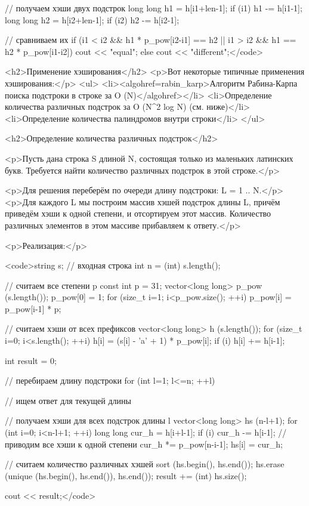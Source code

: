 // получаем хэши двух подстрок
long long h1 = h[i1+len-1];
if (i1)  h1 -= h[i1-1];
long long h2 = h[i2+len-1];
if (i2)  h2 -= h[i2-1];

// сравниваем их
if (i1 < i2 && h1 * p_pow[i2-i1] == h2 ||
	i1 > i2 && h1 == h2 * p_pow[i1-i2])
	cout << "equal";
else
	cout << "different";</code>

<h2>Применение хэширования</h2>
<p>Вот некоторые типичные применения хэширования:</p>
<ul>
<li><algohref=rabin_karp>Алгоритм Рабина-Карпа поиска подстроки в строке за O (N)</algohref></li>
<li>Определение количества различных подстрок за O (N^2 log N) (см. ниже)</li>
<li>Определение количества палиндромов внутри строки</li>
</ul>

<h2>Определение количества различных подстрок</h2>

<p>Пусть дана строка S длиной N, состоящая только из маленьких латинских букв. Требуется найти количество различных подстрок в этой строке.</p>

<p>Для решения переберём по очереди длину подстроки: L = 1 .. N.</p>
<p>Для каждого L мы построим массив хэшей подстрок длины L, причём приведём хэши к одной степени, и отсортируем этот массив. Количество различных элементов в этом массиве прибавляем к ответу.</p>

<p>Реализация:</p>

<code>string s; // входная строка
int n = (int) s.length();

// считаем все степени p
const int p = 31;
vector<long long> p_pow (s.length());
p_pow[0] = 1;
for (size_t i=1; i<p_pow.size(); ++i)
	p_pow[i] = p_pow[i-1] * p;

// считаем хэши от всех префиксов
vector<long long> h (s.length());
for (size_t i=0; i<s.length(); ++i)
{
	h[i] = (s[i] - 'a' + 1) * p_pow[i];
	if (i)  h[i] += h[i-1];
}

int result = 0;

// перебираем длину подстроки
for (int l=1; l<=n; ++l)
{
	// ищем ответ для текущей длины

	// получаем хэши для всех подстрок длины l
	vector<long long> hs (n-l+1);
	for (int i=0; i<n-l+1; ++i)
	{
		long long cur_h = h[i+l-1];
		if (i)  cur_h -= h[i-1];
		// приводим все хэши к одной степени
		cur_h *= p_pow[n-i-1];
		hs[i] = cur_h;
	}

	// считаем количество различных хэшей
	sort (hs.begin(), hs.end());
	hs.erase (unique (hs.begin(), hs.end()), hs.end());
	result += (int) hs.size();
}

cout << result;</code>
